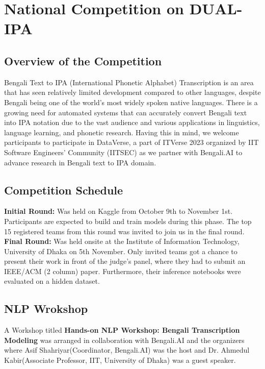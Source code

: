 \chapter{National Competition on DUAL-IPA}

\section{Overview of the Competition}

Bengali Text to IPA (International Phonetic Alphabet) Transcription is an area that has seen relatively limited development compared to other languages, despite Bengali being one of the world's most widely spoken native languages. There is a growing need for automated systems that can accurately convert Bengali text into IPA notation due to the vast audience and various applications in linguistics, language learning, and phonetic research. Having this in mind, we welcome participants to participate in DataVerse, a part of ITVerse 2023 organized by IIT Software Engineers' Community (IITSEC) as we partner with Bengali.AI to advance research in Bengali text to IPA domain.




\section{Competition Schedule}

\textbf{Initial Round:} Was held on Kaggle from October 9th to November 1st. Participants are expected to build and train models during this phase. The top 15 registered teams from this round was invited to join us in the final round.
\\
\textbf{Final Round:} Was held onsite at the Institute of Information Technology, University of Dhaka on 5th November. Only invited teams got a chance to present their work in front of the judge's panel, where they had to submit an IEEE/ACM (2 column) paper. Furthermore, their inference notebooks were evaluated on a hidden dataset.

\newpage

\section{NLP Wrokshop}
A Workshop titled \textbf{Hands-on NLP Workshop: Bengali Transcription Modeling} was arranged in collaboration with Bengali.AI and the organizers where Asif Shahriyar(Coordinator, Bengali.AI) was the host and Dr. Ahmedul Kabir(Associate Professor, IIT, University of Dhaka) was a guest speaker.

